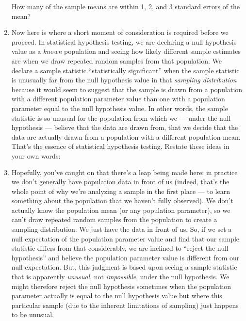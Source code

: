 \documentclass[a4paper,12pt]{article}
\begin{document}
\begin{enumerate}
\noindent How many of the sample means are within 1, 2, and 3 standard errors of the mean? 

\vspace{4em}

\item Now here is where a short moment of consideration is required before we proceed. In statistical hypothesis testing, we are declaring a null hypothesis value as a \textit{known} population and seeing how likely different sample estimates are when we draw repeated random samples from that population. We declare a sample statistic ``statistically significant'' when the sample statistic is unusually far from the null hypothesis value in that \textit{sampling distribution} because it would seem to suggest that the sample is drawn from a population with a different population parameter value than one with a population parameter equal to the null hypothesis value. In other words, the sample statistic is so unusual for the population from which we --- under the null hypothesis --- believe that the data are drawn from, that we decide that the data are actually drawn from a population with a different population mean. That's the essence of statistical hypothesis testing. Restate these ideas in your own words:

\vspace{6em}

\item Hopefully, you've caught on that there's a leap being made here: in practice we don't generally have population data in front of us (indeed, that's the whole point of why we're analyzing a sample in the first place --- to learn something about the population that we haven't fully observed). We don't actually know the population mean (or any population parameter), so we can't draw repeated random samples from the population to create a sampling distribution. We just have the data in front of us. So, if we set a null expectation of the population parameter value and find that our sample statistic differs from that considerably, we are inclined to ``reject the null hypothesis'' and believe the population parameter value is different from our null expectation. But, this judgment is based upon seeing a sample statistic that is apparently \textit{unusual}, not \textit{impossible}, under the null hypothesis. We might therefore reject the null hypothesis sometimes when the population parameter actually is equal to the null hypothesis value but where this particular sample (due to the inherent limitations of sampling) just happens to be unusual. 


\end{enumerate}
\end{document}
